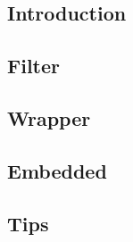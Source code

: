 
\subsection{Introduction}


\subsection{Filter}


\subsection{Wrapper}


\subsection{Embedded}


\subsection{Tips}



